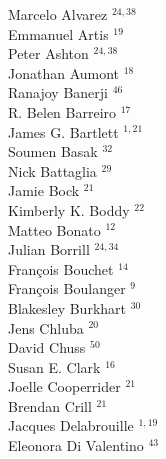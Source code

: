 \documentclass[PICOReport.tex]{subfiles}
\begin{document}
\footnotesize {

\begin{multicols}{4}
Marcelo Alvarez $^{24,38}$                 \\
Emmanuel Artis $^{19}$                  \\
Peter Ashton $^{24,38}$                    \\
Jonathan Aumont $^{18}$                 \\
Ranajoy Banerji $^{46}$                 \\
R. Belen Barreiro $^{17}$                  \\
James G. Bartlett $^{1,21}$               \\
Soumen Basak $^{32}$                    \\
Nick Battaglia $^{29}$                  \\
Jamie Bock $^{21}$                      \\
Kimberly K. Boddy $^{22}$               \\
Matteo Bonato $^{12}$                   \\
Julian Borrill $^{24,34}$                  \\
Fran\c{c}ois Bouchet $^{14}$            \\
Fran\c{c}ois Boulanger $^{9}$          \\
Blakesley Burkhart $^{30}$              \\
Jens Chluba $^{20}$                     \\
David Chuss $^{50}$                     \\
Susan E. Clark $^{16}$                  \\
Joelle Cooperrider $^{21}$              \\
Brendan Crill $^{21}$                   \\
Jacques Delabrouille $^{1,19}$            \\
Eleonora Di Valentino $^{43}$           \\

\end{multicols}}
\end{document}
